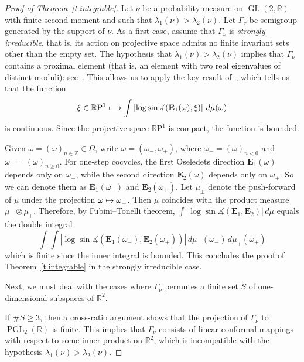 \documentclass[10pt]{amsart}
\theoremstyle{definition}\newtheorem{defi}[theo]{Definition}\newtheorem{rema}[theo]{Remark}\newtheorem{exam}[theo]{Example}\newtheorem{exem}[theo]{Example}\newtheorem{nota}[theo]{Notation}
\newcommand{\smallplus}{+}\newcommand{\smallminus}{-}\newcommand{\smalltimes}{\times}\newcommand{\smallpm}{\pm}\newcommand{\smallmp}{\mp}
\DeclareMathOperator{\PGL}{PGL}
\newcommand{\Z}{\mathbb{Z}}
\newcommand{\R}{\mathbb{R}}
\newcommand{\E}{\mathbf{E}}
\newcommand{\rmP}{\mathrm{P}}
\DeclareMathOperator{\GL}{GL}
\renewcommand{\angle}{\measuredangle}
\let\oldmapsto\mapsto
\renewcommand*{\mapsto}{\mathchoice{\longmapsto}{\oldmapsto}{\oldmapsto}{\oldmapsto}}
\begin{document}
\begin{proof}[Proof of Theorem~\ref{t.integrable}]
Let $\nu$ be a probability measure on $\GL(2,\R)$ with finite second moment and such that $\lambda_1(\nu) > \lambda_2(\nu)$. Let $\Gamma_\nu$ be semigroup generated by the support of $\nu$. As a first case, assume that $\Gamma_\nu$ is \emph{strongly irreducible}, that is, its action on projective space admits no finite invariant sets other than the empty set. The hypothesis that $\lambda_1(\nu) > \lambda_2(\nu)$ implies that $\Gamma_\nu$ contains a proximal element (that is, an element with two real eigenvalues of distinct moduli): see~\cite[Lemma~4.1]{BQbook}. This allows us to apply the key result of~\cite[Proposition~4.5]{benoist-quint}, which tells us that the function
\begin{equation}
\xi \in \R \rmP^1 \mapsto \int \left| \log \sin \angle (\E_1(\omega), \xi) \right| \, d\mu(\omega)
\end{equation}
is continuous. Since the projective space $\R \rmP^1$ is compact, the function is bounded.

Given $\omega = (\omega)_{n \in \Z} \in \Omega$, write $\omega = (\omega_{\smallminus},\omega_{\smallplus})$, where $\omega_{\smallminus} = (\omega)_{n<0}$ and $\omega_{\smallplus} = (\omega)_{n \ge 0}$. For one-step cocycles, the first Oseledets direction $\E_1(\omega)$ depends only on $\omega_{\smallminus}$, while the second direction $\E_2(\omega)$ depends only on $\omega_{\smallplus}$. So we can denote them as $\E_1(\omega_{\smallminus})$ and $\E_2(\omega_{\smallplus})$. Let $\mu_{\smallpm}$ denote the push-forward of $\mu$ under the projection $\omega \mapsto \omega_{\smallpm}$. Then $\mu$ coincides with the product measure $\mu_\smallminus \otimes \mu_\smallplus$. Therefore, by Fubini--Tonelli theorem, $\int \left| \log \sin \angle (\E_1, \E_2) \right| \, d\mu$ equals the double integral
\begin{equation}
\int \int \left| \log \sin \angle (\E_1(\omega_{\smallminus}), \E_2(\omega_{\smallplus})) \right| \, d\mu_{\smallminus}(\omega_{\smallminus}) \, d\mu_{\smallplus}(\omega_{\smallplus})
\end{equation}
which is finite since the inner integral is bounded. This concludes the proof of Theorem~\ref{t.integrable} in the strongly irreducible case.

Next, we must deal with the cases where $\Gamma_\nu$ permutes a finite set $S$ of one-dimensional subspaces of $\R^2$.

If $\# S \ge 3$, then a cross-ratio argument shows that the projection of $\Gamma_\nu$ to $\PGL_2(\R)$ is finite. This implies that $\Gamma_\nu$ consists of linear conformal mappings with respect to some inner product on $\R^2$, which is incompatible with the hypothesis $\lambda_1(\nu) > \lambda_2(\nu)$.


\end{proof}
\end{document}
